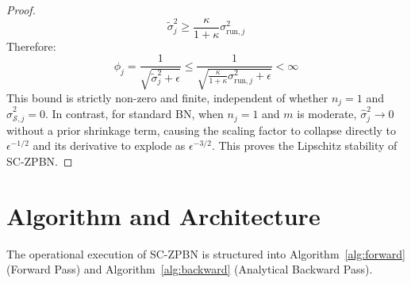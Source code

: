 \documentclass[twocolumn,10pt]{article}
\begin{document}
\begin{proof}
\begin{equation*}
\tilde{\sigma}_j^2 \ge \frac{\kappa}{1 + \kappa}\sigma_{\mathrm{run}, j}^2
\end{equation*}
Therefore:
\begin{equation*}
\phi_j = \frac{1}{\sqrt{\tilde{\sigma}_j^2 + \epsilon}} \le \frac{1}{\sqrt{\frac{\kappa}{1 + \kappa}\sigma_{\mathrm{run}, j}^2 + \epsilon}} < \infty
\end{equation*}
This bound is strictly non-zero and finite, independent of whether $n_j=1$ and $\hat{\sigma}_{\mathcal{S}, j}^2 = 0$. In contrast, for standard BN, when $n_j=1$ and $m$ is moderate, $\hat{\sigma}_j^2 \to 0$ without a prior shrinkage term, causing the scaling factor to collapse directly to $\epsilon^{-1/2}$ and its derivative to explode as $\epsilon^{-3/2}$. This proves the Lipschitz stability of SC-ZPBN.
\end{proof}

\section{Algorithm and Architecture}
\label{sec:algorithm}

The operational execution of SC-ZPBN is structured into Algorithm~\ref{alg:forward} (Forward Pass) and Algorithm~\ref{alg:backward} (Analytical Backward Pass).
\end{document}

